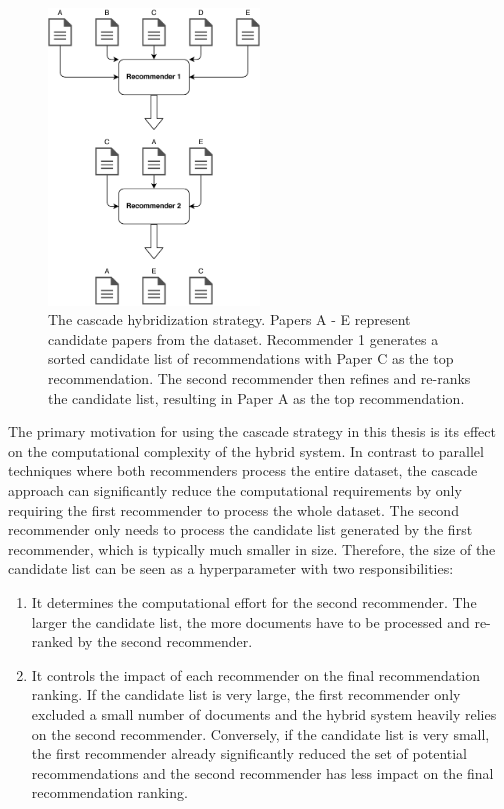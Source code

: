 \begin{figure}[ht]
    \centering
    \includegraphics[width=0.5\textwidth]{diagrams/cascade.pdf}
    \caption[Cascade Hybridization Strategy]{The cascade hybridization strategy. Papers A - E represent candidate papers from the dataset. Recommender 1 generates a sorted candidate list of recommendations with Paper C as the top recommendation. The second recommender then refines and re-ranks the candidate list, resulting in Paper A as the top recommendation.}
    \label{fig:cascade}
\end{figure}

The primary motivation for using the cascade strategy in this thesis is its effect on the computational complexity of the hybrid system. In contrast to parallel techniques where both recommenders process the entire dataset, the cascade approach can significantly reduce the computational requirements by only requiring the first recommender to process the whole dataset. The second recommender only needs to process the candidate list generated by the first recommender, which is typically much smaller in size.
Therefore, the size of the candidate list can be seen as a hyperparameter with two responsibilities:

\begin{enumerate}
    \item It determines the computational effort for the second recommender. The larger the candidate list, the more documents have to be processed and re-ranked by the second recommender.
    \item It controls the impact of each recommender on the final recommendation ranking. If the candidate list is very large, the first recommender only excluded a small number of documents and the hybrid system heavily relies on the second recommender. Conversely, if the candidate list is very small, the first recommender already significantly reduced the set of potential recommendations and the second recommender has less impact on the final recommendation ranking.
\end{enumerate}


